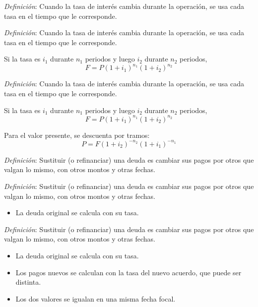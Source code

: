 \documentclass{beamer}
\begin{document}
  \begin{frame}
    \textit{Definición}: Cuando la tasa de interés cambia durante la operación,
    se usa cada tasa en el tiempo que le corresponde.
  \end{frame}

  \begin{frame}
    \textit{Definición}: Cuando la tasa de interés cambia durante la operación,
    se usa cada tasa en el tiempo que le corresponde.
    \newline\newline

    Si la tasa es $i_1$ durante $n_1$ periodos y luego $i_2$ durante $n_2$
    periodos,
    \[F = P(1+i_1)^{n_1}(1+i_2)^{n_2}\]
  \end{frame}

  \begin{frame}
    \textit{Definición}: Cuando la tasa de interés cambia durante la operación,
    se usa cada tasa en el tiempo que le corresponde.
    \newline\newline

    Si la tasa es $i_1$ durante $n_1$ periodos y luego $i_2$ durante $n_2$
    periodos,
    \[F = P(1+i_1)^{n_1}(1+i_2)^{n_2}\]

    Para el valor presente, se descuenta por tramos:
    \[P = F(1+i_2)^{-n_2}(1+i_1)^{-n_1}\]
  \end{frame}

  \begin{frame}
    \textit{Definición}: Sustituir (o refinanciar) una deuda es cambiar sus pagos
    por otros que valgan lo mismo, con otros montos y otras fechas.
  \end{frame}

  \begin{frame}
    \textit{Definición}: Sustituir (o refinanciar) una deuda es cambiar sus pagos
    por otros que valgan lo mismo, con otros montos y otras fechas.

    \begin{itemize}
      \item La deuda original se calcula con su tasa.
    \end{itemize}
  \end{frame}

  \begin{frame}
    \textit{Definición}: Sustituir (o refinanciar) una deuda es cambiar sus pagos
    por otros que valgan lo mismo, con otros montos y otras fechas.

    \begin{itemize}
      \item La deuda original se calcula con su tasa.
      \item Los pagos nuevos se calculan con la tasa del nuevo acuerdo, que puede
      ser distinta.
      \item Los dos valores se igualan en una misma fecha focal.
    \end{itemize}
  \end{frame}
\end{document}
